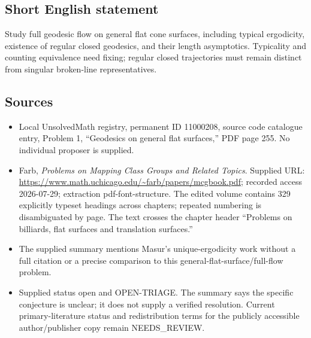 \documentclass[11pt]{article}
\begin{document}
\subsection{Short English statement}
Study full geodesic flow on general flat cone surfaces, including typical ergodicity, existence of regular closed geodesics, and their length asymptotics. Typicality and counting equivalence need fixing; regular closed trajectories must remain distinct from singular broken-line representatives.
\subsection{Sources}
\begin{itemize}
\item Local UnsolvedMath registry, permanent ID 11000208, source code catalogue entry, Problem 1, ``Geodesics on general flat surfaces,'' PDF page 255. No individual proposer is supplied.
\item Farb, \emph{Problems on Mapping Class Groups and Related Topics}. Supplied URL: \url{https://www.math.uchicago.edu/~farb/papers/mcgbook.pdf}; recorded access 2026-07-29; extraction pdf-font-structure. The edited volume contains 329 explicitly typeset headings across chapters; repeated numbering is disambiguated by page. The text crosses the chapter header ``Problems on billiards, flat surfaces and translation surfaces.''
\item The supplied summary mentions Masur's unique-ergodicity work without a full citation or a precise comparison to this general-flat-surface/full-flow problem.
\item Supplied status open and OPEN-TRIAGE. The summary says the specific conjecture is unclear; it does not supply a verified resolution. Current primary-literature status and redistribution terms for the publicly accessible author/publisher copy remain NEEDS\_REVIEW.
\end{itemize}
\end{document}
